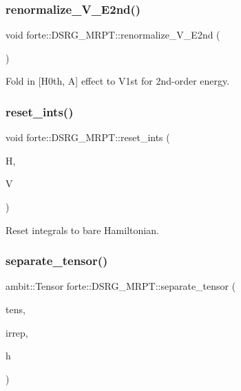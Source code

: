 \subsubsection{\texorpdfstring{renormalize\+\_\+\+V\+\_\+\+E2nd()}{renormalize\_V\_E2nd()}}
{\footnotesize\ttfamily void forte\+::\+D\+S\+R\+G\+\_\+\+M\+R\+P\+T\+::renormalize\+\_\+\+V\+\_\+\+E2nd (\begin{DoxyParamCaption}{ }\end{DoxyParamCaption})\hspace{0.3cm}{\ttfamily [protected]}}



Fold in \mbox{[}H0th, A\mbox{]} effect to V1st for 2nd-\/order energy. 

\mbox{\label{classforte_1_1_d_s_r_g___m_r_p_t_adcf156a0f6b3caa2637d743789b9c68e}} 
\subsubsection{\texorpdfstring{reset\+\_\+ints()}{reset\_ints()}}
{\footnotesize\ttfamily void forte\+::\+D\+S\+R\+G\+\_\+\+M\+R\+P\+T\+::reset\+\_\+ints (\begin{DoxyParamCaption}\item[{Blocked\+Tensor \&}]{H,  }\item[{Blocked\+Tensor \&}]{V }\end{DoxyParamCaption})\hspace{0.3cm}{\ttfamily [protected]}}



Reset integrals to bare Hamiltonian. 

\mbox{\label{classforte_1_1_d_s_r_g___m_r_p_t_ada139ac0e12cbee87aacb94af7510868}} 
\subsubsection{\texorpdfstring{separate\+\_\+tensor()}{separate\_tensor()}}
{\footnotesize\ttfamily ambit\+::\+Tensor forte\+::\+D\+S\+R\+G\+\_\+\+M\+R\+P\+T\+::separate\+\_\+tensor (\begin{DoxyParamCaption}\item[{ambit\+::\+Tensor \&}]{tens,  }\item[{const psi\+::\+Dimension \&}]{irrep,  }\item[{const int \&}]{h }\end{DoxyParamCaption})\hspace{0.3cm}{\ttfamily [protected]}}



